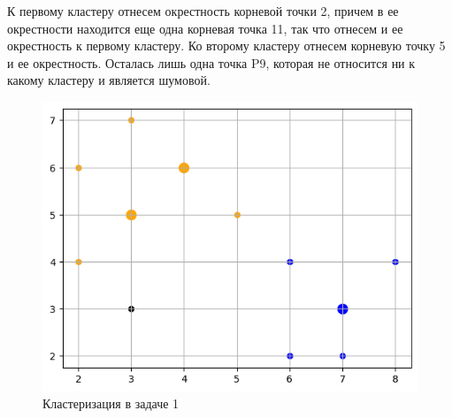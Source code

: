 К первому кластеру отнесем окрестность корневой точки 2, причем в ее окрестности находится еще одна корневая точка 11, так что отнесем и ее окрестность к первому кластеру. Ко второму кластеру отнесем корневую точку 5 и ее окрестность. Осталась лишь одна точка P9, которая не относится ни к какому кластеру и является шумовой.
\begin{figure}[ht!]
    \centering
    \includegraphics[width=0.7\linewidth]{chapters/clustering/png/task1dbs_plot.png}
    \caption{Кластеризация в задаче 1}
    \label{fig:task1dbs}
\end{figure}

